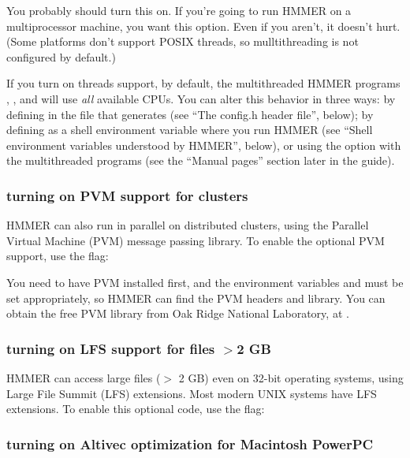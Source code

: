 
You probably should turn this on. If you're going to run HMMER on a
multiprocessor machine, you want this option. Even if you aren't, it
doesn't hurt. (Some platforms don't support POSIX threads, so
mulltithreading is not configured by default.)

If you turn on threads support, by default, the multithreaded HMMER
programs , , and 
will use \emph{all} available CPUs. You can alter this behavior in
three ways: by defining  in the 
file that  generates (see ``The config.h header
file'', below); by defining  as a shell environment
variable where you run HMMER (see ``Shell environment variables
understood by HMMER'', below), or using the  option
with the multithreaded programs (see the ``Manual pages'' section
later in the guide).

\subsubsection{turning on PVM support for clusters}

HMMER can also run in parallel on distributed clusters, using the
Parallel Virtual Machine (PVM) message passing library.  To enable
the optional PVM support, use the  flag:


You need to have PVM installed first, and the environment variables
 and  must be set appropriately, so
HMMER can find the PVM headers and library.  You can obtain the free
PVM library from Oak Ridge National Laboratory, at
.

\subsubsection{turning on LFS support for files $>$2 GB}

HMMER can access large files ($>$ 2 GB) even on 32-bit operating
systems, using Large File Summit (LFS) extensions.  Most modern UNIX
systems have LFS extensions. To enable this optional code, use the
 flag:


\subsubsection{turning on Altivec optimization for Macintosh PowerPC}

